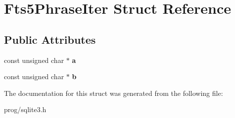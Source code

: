 \hypertarget{struct_fts5_phrase_iter}{}\section{Fts5\+Phrase\+Iter Struct Reference}
\label{struct_fts5_phrase_iter}
\subsection*{Public Attributes}
\begin{DoxyCompactItemize}
\item 
\mbox{\label{struct_fts5_phrase_iter_a335969d1ac0fcbb94173c472a3f179ae}} 
const unsigned char $\ast$ {\bfseries a}
\item 
\mbox{\label{struct_fts5_phrase_iter_a459180b0d670604aa38b3ac94be6adda}} 
const unsigned char $\ast$ {\bfseries b}
\end{DoxyCompactItemize}


The documentation for this struct was generated from the following file\+:\begin{DoxyCompactItemize}
\item 
prog/sqlite3.\+h\end{DoxyCompactItemize}
